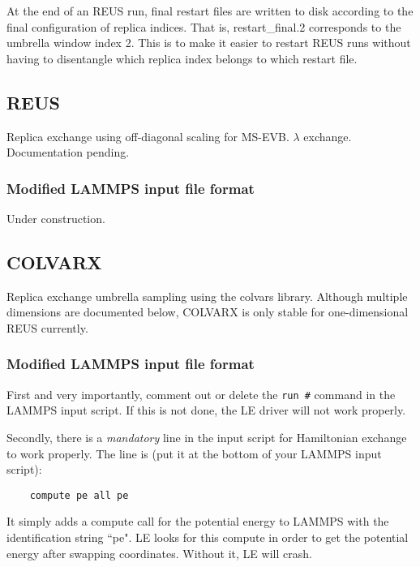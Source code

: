 \documentclass[10pt]{article}
\begin{document}
At the end of an REUS run, final restart files are written to disk according to the final configuration of replica indices.
That is, restart\_final.2 corresponds to the umbrella window index 2. This is to make it easier to restart REUS runs without
having to disentangle which replica index belongs to which restart file.


\subsection{REUS}

Replica exchange using off-diagonal scaling for MS-EVB. $\lambda$ exchange. Documentation pending.

\subsubsection{Modified LAMMPS input file format}

Under construction.


\subsection{COLVARX}

Replica exchange umbrella sampling using the colvars library. Although multiple dimensions are documented below,
COLVARX is only stable for one-dimensional REUS currently.

\subsubsection{Modified LAMMPS input file format}

First and very importantly, comment out
or delete the \texttt{run \#} command in the LAMMPS input script. If this is not done,
the LE driver will not work properly. 

Secondly, there is a {\em mandatory} line in the input script for Hamiltonian exchange to work properly.
The line is (put it at the bottom of your LAMMPS input script):
\begin{verbatim}
	compute pe all pe
\end{verbatim}
It simply adds a compute call for the potential energy to LAMMPS with the identification string ``pe". LE looks
for this compute in order to get the potential energy after swapping coordinates. Without it, LE will crash.
\end{document}
